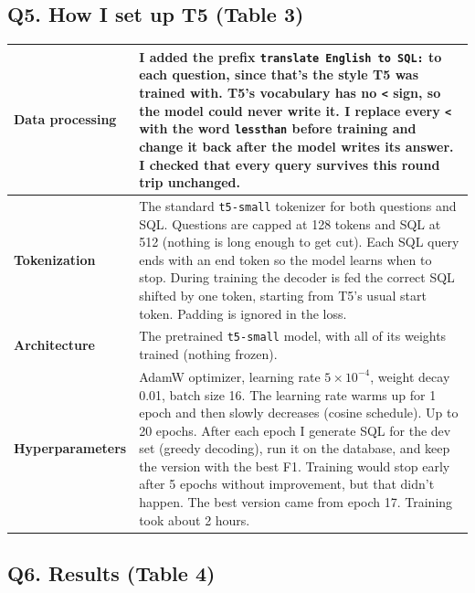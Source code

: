 \documentclass[11pt]{article}
\newcommand{\code}[1]{\texttt{#1}}
\begin{document}
\subsection*{Q5. How I set up T5 (Table 3)}

\begin{table}[H]
\centering
\begin{tabular}{|P{3.45cm}|P{11.45cm}|}
\hline
\textbf{Data processing} &
I added the prefix \code{translate English to SQL:} to each question, since that's the style T5
was trained with. T5's vocabulary has no \code{<} sign, so the model could never write it. I
replace every \code{<} with the word \code{lessthan} before training and change it back after the
model writes its answer. I checked that every query survives this round trip unchanged. \\ \hline
\textbf{Tokenization} &
The standard \code{t5-small} tokenizer for both questions and SQL. Questions are capped at 128
tokens and SQL at 512 (nothing is long enough to get cut). Each SQL query ends with an end token
so the model learns when to stop. During training the decoder is fed the correct SQL shifted by
one token, starting from T5's usual start token. Padding is ignored in the loss. \\ \hline
\textbf{Architecture} &
The pretrained \code{t5-small} model, with all of its weights trained (nothing frozen). \\ \hline
\textbf{Hyperparameters} &
AdamW optimizer, learning rate $5\times10^{-4}$, weight decay 0.01, batch size 16. The learning
rate warms up for 1 epoch and then slowly decreases (cosine schedule). Up to 20 epochs. After each
epoch I generate SQL for the dev set (greedy decoding), run it on the database, and keep the
version with the best F1. Training would stop early after 5 epochs without improvement, but that
didn't happen. The best version came from epoch 17. Training took about 2 hours. \\ \hline
\end{tabular}
\end{table}

\subsection*{Q6. Results (Table 4)}
\end{document}
